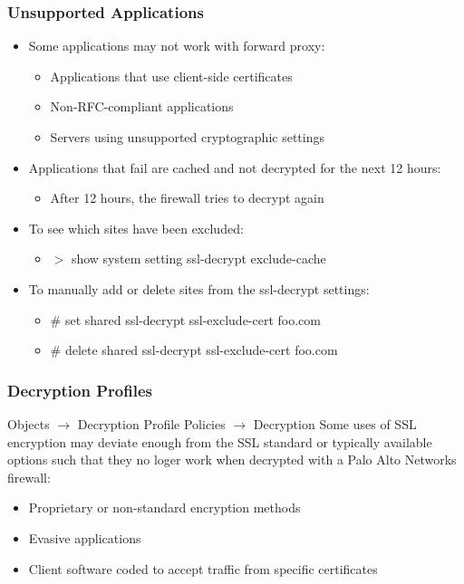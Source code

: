 \subsubsection{Unsupported Applications}
\begin{itemize}
    \item Some applications may not work with forward proxy:
        \begin{itemize}
            \item Applications that use client-side certificates
            \item Non-RFC-compliant applications
            \item Servers using unsupported cryptographic settings
        \end{itemize}
    \item Applications that fail are cached and not decrypted for the next 12 hours:
        \begin{itemize}
            \item After 12 hours, the firewall tries to decrypt again
        \end{itemize}
    \item To see which sites have been excluded:
        \begin{itemize}
            \item $>$ show system setting ssl-decrypt exclude-cache
        \end{itemize}
    \item To manually add or delete sites from the ssl-decrypt settings:
        \begin{itemize}
            \item \# set shared ssl-decrypt ssl-exclude-cert foo.com
            \item \# delete shared ssl-decrypt ssl-exclude-cert foo.com
        \end{itemize}
\end{itemize}

\subsubsection{Decryption Profiles}
Objects $\rightarrow$ Decryption Profile
Policies $\rightarrow$ Decryption
Some uses of SSL encryption may deviate enough from the SSL standard or typically available options such that they no loger work when decrypted with a Palo Alto Networks firewall:
\begin{itemize}
    \item Proprietary or non-standard encryption methods
    \item Evasive applications
    \item Client software coded to accept traffic from specific certificates
\end{itemize}

